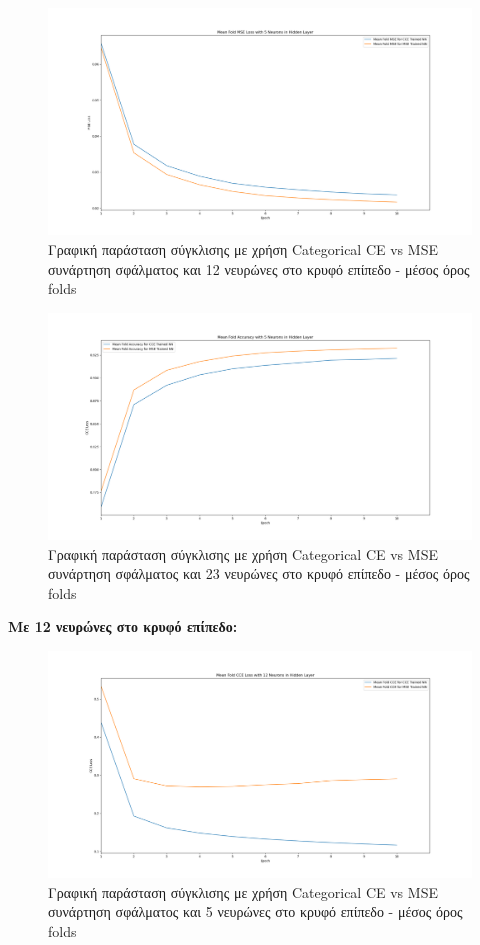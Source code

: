 \documentclass[12pt,a4paper]{article}
\begin{document}
\begin{figure}[H]
	\includegraphics[width=\textwidth]{11. CCE vs MSE - MSE Loss - 5 Neurons - Mean.png}
	\caption{Γραφική παράσταση σύγκλισης με χρήση Categorical CE vs MSE συνάρτηση σφάλματος και 12 νευρώνες στο κρυφό επίπεδο - μέσος όρος folds}
\end{figure}

\begin{figure}[H]
	\includegraphics[width=\textwidth]{12. CCE vs MSE - Accuracy - 5 Neurons - Mean.png}
	\caption{Γραφική παράσταση σύγκλισης με χρήση Categorical CE vs MSE συνάρτηση σφάλματος και 23 νευρώνες στο κρυφό επίπεδο - μέσος όρος folds}
\end{figure}

\textbf{Με 12 νευρώνες στο κρυφό επίπεδο:}

\begin{figure}[H]
	\includegraphics[width=\textwidth]{13. CCE vs MSE - CCE Loss - 12 Neurons - Mean.png}
	\caption{Γραφική παράσταση σύγκλισης με χρήση Categorical CE vs MSE συνάρτηση σφάλματος και 5 νευρώνες στο κρυφό επίπεδο - μέσος όρος folds}
\end{figure}
\end{document}
